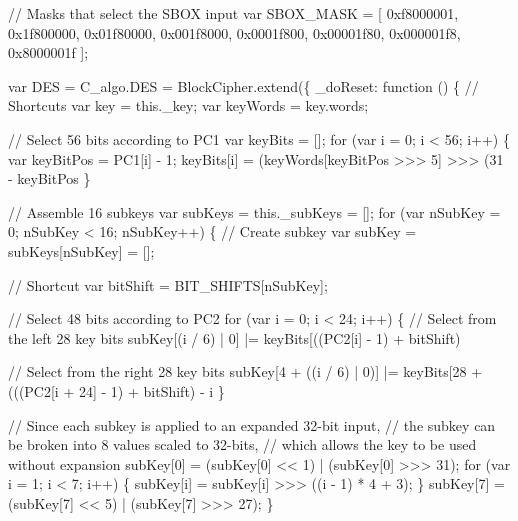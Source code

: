 \begin{DoxyCodeInclude}
    \textcolor{comment}{// Masks that select the SBOX input}
    var SBOX\_MASK = [
        0xf8000001, 0x1f800000, 0x01f80000, 0x001f8000,
        0x0001f800, 0x00001f80, 0x000001f8, 0x8000001f
    ];

    var DES = C\_algo.DES = BlockCipher.extend(\{
        \_doReset: \textcolor{keyword}{function} () \{
            \textcolor{comment}{// Shortcuts}
            var key = this.\_key;
            var keyWords = key.words;

            \textcolor{comment}{// Select 56 bits according to PC1}
            var keyBits = [];
            \textcolor{keywordflow}{for} (var i = 0; i < 56; i++) \{
                var keyBitPos = PC1[i] - 1;
                keyBits[i] = (keyWords[keyBitPos >>> 5] >>> (31 - keyBitPos %
            \}

            \textcolor{comment}{// Assemble 16 subkeys}
            var subKeys = this.\_subKeys = [];
            \textcolor{keywordflow}{for} (var nSubKey = 0; nSubKey < 16; nSubKey++) \{
                \textcolor{comment}{// Create subkey}
                var subKey = subKeys[nSubKey] = [];

                \textcolor{comment}{// Shortcut}
                var bitShift = BIT\_SHIFTS[nSubKey];

                \textcolor{comment}{// Select 48 bits according to PC2}
                \textcolor{keywordflow}{for} (var i = 0; i < 24; i++) \{
                    \textcolor{comment}{// Select from the left 28 key bits}
                    subKey[(i / 6) | 0] |= keyBits[((PC2[i] - 1) + bitShift) %

                    \textcolor{comment}{// Select from the right 28 key bits}
                    subKey[4 + ((i / 6) | 0)] |= keyBits[28 + (((PC2[i + 24] - 1) + bitShift) %
       - i %
                \}

                \textcolor{comment}{// Since each subkey is applied to an expanded 32-bit input,}
                \textcolor{comment}{// the subkey can be broken into 8 values scaled to 32-bits,}
                \textcolor{comment}{// which allows the key to be used without expansion}
                subKey[0] = (subKey[0] << 1) | (subKey[0] >>> 31);
                \textcolor{keywordflow}{for} (var i = 1; i < 7; i++) \{
                    subKey[i] = subKey[i] >>> ((i - 1) * 4 + 3);
                \}
                subKey[7] = (subKey[7] << 5) | (subKey[7] >>> 27);
            \}


\end{DoxyCodeInclude}
